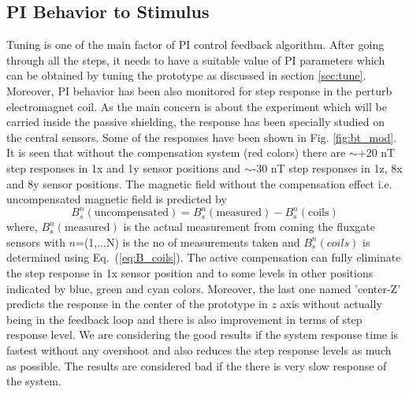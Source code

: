 \subsection{PI Behavior to Stimulus}
Tuning is one of the main factor of PI control feedback algorithm. After going through all the steps, it needs to have a suitable value of PI parameters which can be obtained by tuning the prototype as discussed in section \ref{sec:tune}. Moreover, PI behavior has been also monitored for step response in the perturb electromagnet coil. As the main concern is about the experiment which will be carried inside the passive shielding, the response has been specially studied on the central sensors. Some of the responses have been shown in Fig. \ref{fig:bt_mod}. It is seen that without the compensation system (red colors) there are $\sim$+20 nT step responses in  1x and 1y sensor positions and $\sim$-30 nT step responses in 1z, 8x and 8y sensor positions. The magnetic field without the compensation effect i.e. uncompensated magnetic field is predicted by
\begin{equation}\label{eq:Buncomp}
     B_s^n(\text{uncompensated})=B_s^n(\text{measured})- B_s^n(\text{coils})
\end{equation}
where, $B_s^n(\text{measured})$ is the actual measurement from coming the fluxgate sensors with $n$=(1,...N) is the no of measurements taken and $B_s^n(coils)$ is determined using Eq.~(\ref{eq:B_coils}). The active compensation can fully eliminate the step response in 1x sensor position and to some levels in other positions indicated by blue, green and cyan colors. Moreover, the last one named 'center-Z' predicts the response in the center of the prototype in $z$ axis without actually being in the feedback loop and there is also improvement in terms of step response level. We are considering the good results if the system response time is fastest without any overshoot and also reduces the step response levels as much as possible. The results are considered bad if the there is very slow response of the system.

\FloatBarrier
 
